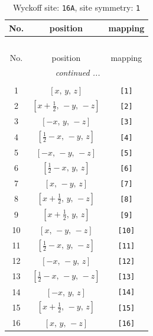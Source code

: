 \documentclass[fleqn,8pt]{jsarticle}
\begin{document}
\begin{longtable}{ccc}
\caption{Wyckoff site: {\tt 16A}, site symmetry: {\tt 1}}
 \\
 \hline \hline
No. & position & mapping \\ \hline \endfirsthead

\multicolumn{2}{l}{\tablename\ \thetable{}} \\
 \hline \hline
No. & position & mapping \\ \hline \endhead

 \hline \hline
\multicolumn{2}{r}{\footnotesize\it continued ...} \\ \endfoot

 \hline \hline
\multicolumn{2}{r}{} \\ \endlastfoot

1 & $\left[ x,\, y,\, z \right]$ & {\tt [1]} \\ \hline
2 & $\left[ x + \frac{1}{2},\, - y,\, - z \right]$ & {\tt [2]} \\ \hline
3 & $\left[ - x,\, y,\, - z \right]$ & {\tt [3]} \\ \hline
4 & $\left[ \frac{1}{2} - x,\, - y,\, z \right]$ & {\tt [4]} \\ \hline
5 & $\left[ - x,\, - y,\, - z \right]$ & {\tt [5]} \\ \hline
6 & $\left[ \frac{1}{2} - x,\, y,\, z \right]$ & {\tt [6]} \\ \hline
7 & $\left[ x,\, - y,\, z \right]$ & {\tt [7]} \\ \hline
8 & $\left[ x + \frac{1}{2},\, y,\, - z \right]$ & {\tt [8]} \\ \hline
9 & $\left[ x + \frac{1}{2},\, y,\, z \right]$ & {\tt [9]} \\ \hline
10 & $\left[ x,\, - y,\, - z \right]$ & {\tt [10]} \\ \hline
11 & $\left[ \frac{1}{2} - x,\, y,\, - z \right]$ & {\tt [11]} \\ \hline
12 & $\left[ - x,\, - y,\, z \right]$ & {\tt [12]} \\ \hline
13 & $\left[ \frac{1}{2} - x,\, - y,\, - z \right]$ & {\tt [13]} \\ \hline
14 & $\left[ - x,\, y,\, z \right]$ & {\tt [14]} \\ \hline
15 & $\left[ x + \frac{1}{2},\, - y,\, z \right]$ & {\tt [15]} \\ \hline
16 & $\left[ x,\, y,\, - z \right]$ & {\tt [16]} \\
\end{longtable}
\end{document}
